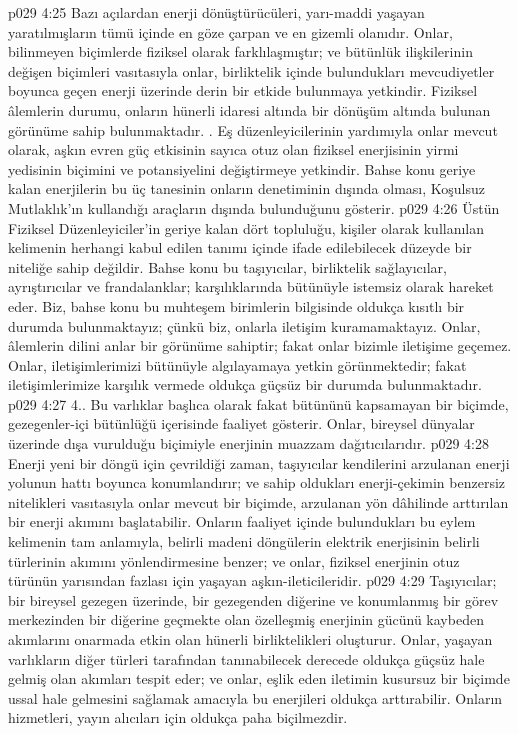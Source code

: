 \vs p029 4:25 Bazı açılardan enerji dönüştürücüleri, yarı\hyp{}maddi yaşayan yaratılmışların tümü içinde en göze çarpan ve en gizemli olanıdır. Onlar, bilinmeyen biçimlerde fiziksel olarak farklılaşmıştır; ve bütünlük ilişkilerinin değişen biçimleri vasıtasıyla onlar, birliktelik içinde bulundukları mevcudiyetler boyunca geçen enerji üzerinde derin bir etkide bulunmaya yetkindir. Fiziksel âlemlerin durumu, onların hünerli idaresi altında bir dönüşüm altında bulunan görünüme sahip bulunmaktadır. . Eş düzenleyicilerinin yardımıyla onlar mevcut olarak, aşkın evren güç etkisinin sayıca otuz olan fiziksel enerjisinin yirmi yedisinin biçimini ve potansiyelini değiştirmeye yetkindir. Bahse konu geriye kalan enerjilerin bu üç tanesinin onların denetiminin dışında olması, Koşulsuz Mutlaklık’ın kullandığı araçların dışında bulunduğunu gösterir.
\vs p029 4:26 Üstün Fiziksel Düzenleyiciler’in geriye kalan dört topluluğu, kişiler olarak kullanılan kelimenin herhangi kabul edilen tanımı içinde ifade edilebilecek düzeyde bir niteliğe sahip değildir. Bahse konu bu taşıyıcılar, birliktelik sağlayıcılar, ayrıştırıcılar ve frandalanklar; karşılıklarında bütünüyle istemsiz olarak hareket eder. Biz, bahse konu bu muhteşem birimlerin bilgisinde oldukça kısıtlı bir durumda bulunmaktayız; çünkü biz, onlarla iletişim kuramamaktayız. Onlar, âlemlerin dilini anlar bir görünüme sahiptir; fakat onlar bizimle iletişime geçemez. Onlar, iletişimlerimizi bütünüyle algılayamaya yetkin görünmektedir; fakat iletişimlerimize karşılık vermede oldukça güçsüz bir durumda bulunmaktadır.
\vs p029 4:27 4.\bibnobreakspace {}. Bu varlıklar başlıca olarak fakat bütününü kapsamayan bir biçimde, gezegenler\hyp{}içi bütünlüğü içerisinde faaliyet gösterir. Onlar, bireysel dünyalar üzerinde dışa vurulduğu biçimiyle enerjinin muazzam dağıtıcılarıdır.
\vs p029 4:28 Enerji yeni bir döngü için çevrildiği zaman, taşıyıcılar kendilerini arzulanan enerji yolunun hattı boyunca konumlandırır; ve sahip oldukları enerji\hyp{}çekimin benzersiz nitelikleri vasıtasıyla onlar mevcut bir biçimde, arzulanan yön dâhilinde arttırılan bir enerji akımını başlatabilir. Onların faaliyet içinde bulundukları bu eylem kelimenin tam anlamıyla, belirli madeni döngülerin elektrik enerjisinin belirli türlerinin akımını yönlendirmesine benzer; ve onlar, fiziksel enerjinin otuz türünün yarısından fazlası için yaşayan aşkın\hyp{}ileticileridir.
\vs p029 4:29 Taşıyıcılar; bir bireysel gezegen üzerinde, bir gezegenden diğerine ve konumlanmış bir görev merkezinden bir diğerine geçmekte olan özelleşmiş enerjinin gücünü kaybeden akımlarını onarmada etkin olan hünerli birliktelikleri oluşturur. Onlar, yaşayan varlıkların diğer türleri tarafından tanınabilecek derecede oldukça güçsüz hale gelmiş olan akımları tespit eder; ve onlar, eşlik eden iletimin kusursuz bir biçimde ussal hale gelmesini sağlamak amacıyla bu enerjileri oldukça arttırabilir. Onların hizmetleri, yayın alıcıları için oldukça paha biçilmezdir.
